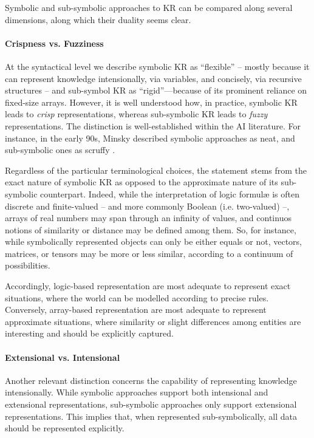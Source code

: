 \documentclass[12pt,a4paper,openright,twoside]{book}
\begin{document}
Symbolic and sub-symbolic approaches to KR can be compared along several dimensions, along which their duality seems clear.

\paragraph{Crispness vs. Fuzziness}

At the syntactical level we describe symbolic KR as ``flexible'' -- mostly because it can represent knowledge intensionally, via variables, and concisely, via recursive structures -- and sub-symbol KR as ``rigid''---because of its prominent reliance on fixed-size arrays.
%
However, it is well understood how, in practice, symbolic KR leads to \emph{crisp} representations, whereas sub-symbolic KR leads to \emph{fuzzy} representations.
%
The distinction is well-established within the AI literature.
%
For instance, in the early 90s, Minsky described symbolic approaches as neat, and sub-symbolic ones as scruffy \cite{Minsky1991}.

Regardless of the particular terminological choices, the statement stems from the exact nature of symbolic KR as opposed to the approximate nature of its sub-symbolic counterpart.
%
Indeed, while the interpretation of logic formul\ae{} is often discrete and finite-valued -- and more commonly Boolean (i.e. two-valued) --, arrays of real numbers may span through an infinity of values, and continuos notions of similarity or distance may be defined among them.
%
So, for instance, while symbolically represented objects can only be either equals or not, vectors, matrices, or tensors may be more or less similar, according to a continuum of possibilities.

Accordingly, logic-based representation are most adequate to represent exact situations, where the world can be modelled according to precise rules.
%
Conversely, array-based representation are most adequate to represent approximate situations, where similarity or slight differences among entities are interesting and should be explicitly captured.

\paragraph{Extensional vs. Intensional}

Another relevant distinction concerns the capability of representing knowledge intensionally.
%
While symbolic approaches support both intensional and extensional representations, sub-symbolic approaches only support extensional representations.
%
This implies that, when represented sub-symbolically, all data should be represented explicitly.
\end{document}
